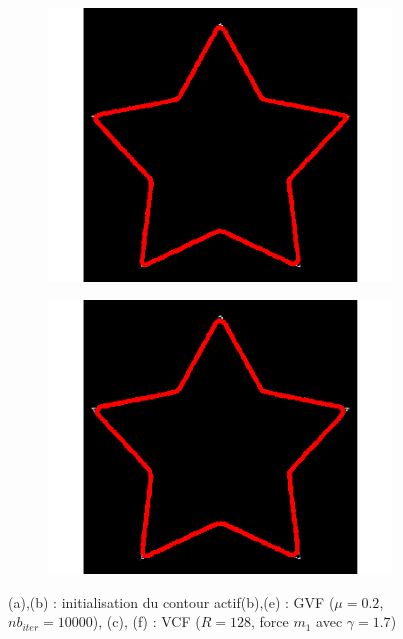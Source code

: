 \begin{appendices}
\begin{figure}[H]
\begin{subfigure}[c]{0.3\linewidth}
\includegraphics[width=\textwidth]{Chapters/Images/Conc/gvfs}
\caption{}
\end{subfigure}
\begin{subfigure}[c]{0.3\linewidth}
\centering
\includegraphics[width=\textwidth]{Chapters/Images/Conc/vfcs}
\caption{}
\end{subfigure}
\caption{(a),(b) : initialisation du contour actif(b),(e) : GVF ($\mu = 0.2$, $nb_{iter} = 10000$), (c), (f) : VCF ($R = 128$, force $m_{1}$ avec $\gamma = 1.7$)}
\end{figure}


\end{appendices}
